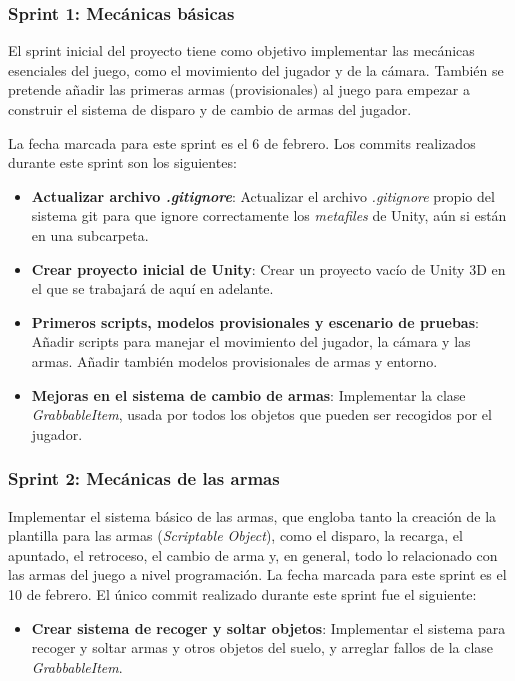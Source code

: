 \subsubsection{Sprint 1: Mecánicas básicas}
El sprint inicial del proyecto tiene como objetivo implementar las mecánicas esenciales del juego, como el movimiento del jugador y de la cámara. También se pretende añadir las primeras armas (provisionales) al juego para empezar a construir el sistema de disparo y de cambio de armas del jugador.

La fecha marcada para este sprint es el 6 de febrero. Los commits realizados durante este sprint son los siguientes:

\begin{itemize}
    \item \textbf{Actualizar archivo \textit{.gitignore}}: Actualizar el archivo \textit{.gitignore} propio del sistema git para que ignore correctamente los \textit{metafiles} de Unity, aún si están en una subcarpeta.
    \item \textbf{Crear proyecto inicial de Unity}: Crear un proyecto vacío de Unity 3D en el que se trabajará de aquí en adelante.
    \item \textbf{Primeros scripts, modelos provisionales y escenario de pruebas}: Añadir scripts para manejar el movimiento del jugador, la cámara y las armas. Añadir también modelos provisionales de armas y entorno.
    \item \textbf{Mejoras en el sistema de cambio de armas}: Implementar la clase \textit{GrabbableItem}, usada por todos los objetos que pueden ser recogidos por el jugador.
\end{itemize}
\subsubsection{Sprint 2: Mecánicas de las armas}
Implementar el sistema básico de las armas, que engloba tanto la creación de la plantilla para las armas (\textit{Scriptable Object}), como el disparo, la recarga, el apuntado, el retroceso, el cambio de arma y, en general, todo lo relacionado con las armas del juego a nivel programación.
La fecha marcada para este sprint es el 10 de febrero. El único commit realizado durante este sprint fue el siguiente:
\begin{itemize}
    \item \textbf{Crear sistema de recoger y soltar objetos}: Implementar el sistema para recoger y soltar armas y otros objetos del suelo, y arreglar fallos de la clase \textit{GrabbableItem}.
\end{itemize}
